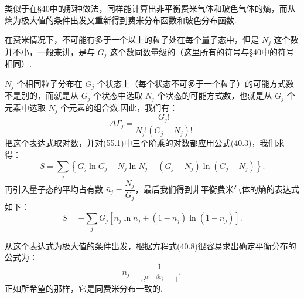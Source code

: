 类似于在§40中的那种做法，同样能计算出非平衡费米气体和玻色气体的熵，而从熵为极大值的条件出发又重新得到费米分布函数和玻色分布函数.

在费米情况下，不可能有多于一个以上的粒子处在每个量子态中，但是 $N_j$ 这个数并不小，一般来讲，是与 $G_j$ 这个数同数量级的（这里所有的符号与§40中的符号相同）.

$N_j$ 个相同粒子分布在 $G_j$ 个状态上（每个状态不可多于一个粒子）的可能方式数不是别的，而就是从 $G_j$ 个状态中选取 $N_j$ 个状态的可能方式数，也就是从 $G_j$ 个元素中选取 $N_j$ 个元素的组合数.因此，我们有：
\begin{equation}
  \Delta\varGamma_j=\frac{G_j!}{N_j!\left(G_j-N_j\right)!}.
\end{equation}
把这个表达式取对数，并对(55.1)中三个阶乘的对数都应用公式(40.3)，我们求得：
\begin{equation}
  S=\sum_j\left\{G_j\ln G_j-N_j\ln N_j-\left(G_j-N_j\right)\ln\left(G_j-N_j\right)\right\}.
\end{equation}
再引入量子态的平均占有数 $\bar{n}_j=\dfrac{N_j}{G_j}$，最后我们得到非平衡费米气体的熵的表达式如下：
\begin{equation}
  S=-\sum_jG_j\left[\bar{n}_j\ln\bar{n}_j+\left(1-\bar{n}_j\right)\ln\left(1-\bar{n}_j\right)\right].
\end{equation}

从这个表达式为极大值的条件出发，根据方程式(40.8)很容易求出确定平衡分布的公式为：
\begin{equation*}
  \bar{n}_j=\frac{1}{\mathrm{e}^{\alpha+\beta\varepsilon_j}+1},
\end{equation*}
正如所希望的那样，它是同费米分布一致的.

